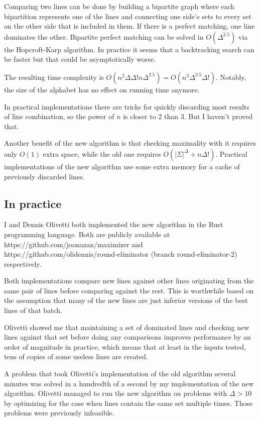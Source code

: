 \documentclass[english, 12pt, a4paper, sci, a-1b, online]{aaltothesis}
\begin{document}
Comparing two lines can be done by building a bipartite graph where each bipartition represents one of the lines and connecting one side's sets to every set on the other side that is included in them. If there is a perfect matching, one line dominates the other. Bipartite perfect matching can be solved in $O(\Delta^{2.5})$ via the Hopcroft-Karp algorithm. In practice it seems that a backtracking search can be faster but that could be asymptotically worse.

The resulting time complexity is $O(n^2\Delta\Delta!n\Delta^{2.5}) = O(n^3\Delta^{3.5}\Delta!)$. Notably, the size of the alphabet has no effect on running time anymore.

In practical implementations there are tricks for quickly discarding most results of line combination, so the power of $n$ is closer to 2 than 3. But I haven't proved that.

Another benefit of the new algorithm is that checking maximality with it requires only $O(1)$ extra space, while the old one requires $O(|\Sigma|^{\Delta} + n\Delta!)$. Practical implementations of the new algorithm use some extra memory for a cache of previously discarded lines.

\subsection{In practice}

I and Dennis Olivetti both implemented the new algorithm in the Rust programming language. Both are publicly available at https://github.com/joonazan/maximizer and https://github.com/olidennis/round-eliminator (branch round-eliminator-2) respectively.

Both implementations compare new lines against other lines originating from the same pair of lines before comparing against the rest. This is worthwhile based on the assumption that many of the new lines are just inferior versions of the best lines of that batch.

Olivetti showed me that maintaining a set of dominated lines and checking new lines against that set before doing any comparisons improves performance by an order of magnitude in practice, which means that at least in the inputs tested, tens of copies of some useless lines are created.

A problem that took Olivetti's implementation of the old algorithm several minutes was solved in a hundredth of a second by my implementation of the new algorithm. Olivetti managed to run the new algorithm on problems with $\Delta > 10$ by optimizing for the case when lines contain the same set multiple times. Those problems were previously infeasible.
\end{document}

